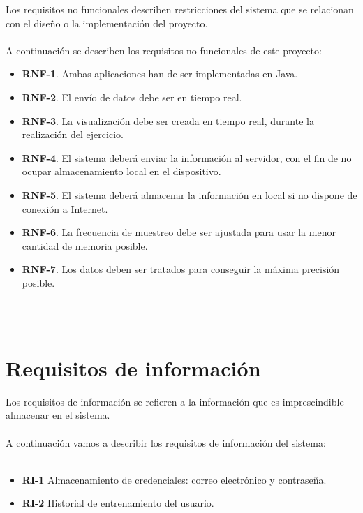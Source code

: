 Los requisitos no funcionales describen restricciones del sistema que se relacionan con el diseño o la implementación del proyecto.
\\
\\
A continuación se describen los requisitos no funcionales de este proyecto:
\\
\begin{itemize}
\item \textbf{RNF-1}. Ambas aplicaciones han de ser implementadas en Java.
\item \textbf{RNF-2}. El envío de datos debe ser en tiempo real.
\item \textbf{RNF-3}. La visualización debe ser creada en tiempo real, durante la realización del ejercicio.
\item \textbf{RNF-4}. El sistema deberá enviar la información al servidor, con el fin de no ocupar almacenamiento local en el dispositivo.
\item \textbf{RNF-5}. El sistema deberá almacenar la información en local si no dispone de conexión a Internet.
\item \textbf{RNF-6}. La frecuencia de muestreo debe ser ajustada para usar la menor cantidad de memoria posible.
\item \textbf{RNF-7}. Los datos deben ser tratados para conseguir la máxima precisión posible.
\end{itemize}
\\
\\
\section{Requisitos de información}

Los requisitos de información se refieren a la información que es imprescindible almacenar en el sistema.
\\
\\
A continuación vamos a describir los requisitos de información del sistema:
\\
\\
\begin{itemize}
    \item \textbf{RI-1} Almacenamiento de credenciales: correo electrónico y contraseña.
    \item \textbf{RI-2} Historial de entrenamiento del usuario.
\end{itemize}
